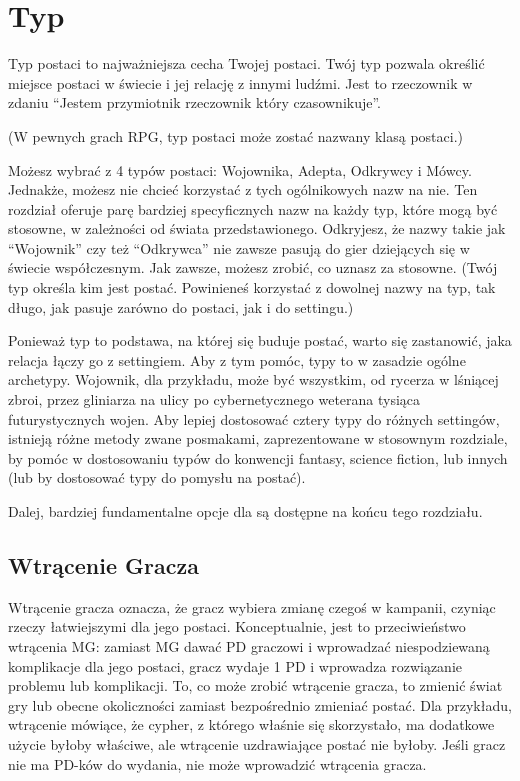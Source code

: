 \section{Typ}

Typ postaci to najważniejsza cecha Twojej postaci. Twój typ pozwala określić miejsce postaci w świecie i jej relację z innymi ludźmi. Jest to rzeczownik w zdaniu “Jestem przymiotnik rzeczownik który czasownikuje”.

(W pewnych grach RPG, typ postaci może zostać nazwany klasą postaci.)

Możesz wybrać z 4 typów postaci: Wojownika, Adepta, Odkrywcy i Mówcy. Jednakże, możesz nie chcieć korzystać z tych ogólnikowych nazw na nie. Ten rozdział oferuje parę bardziej specyficznych nazw na każdy typ, które mogą być stosowne, w zależności od świata przedstawionego. Odkryjesz, że nazwy takie jak “Wojownik” czy też “Odkrywca” nie zawsze pasują do gier dziejących się w świecie współczesnym. Jak zawsze, możesz zrobić, co uznasz za stosowne. (Twój typ określa kim jest postać. Powinieneś korzystać z dowolnej nazwy na typ, tak długo, jak pasuje zarówno do postaci, jak i do settingu.)

Ponieważ typ to podstawa, na której się buduje postać, warto się zastanowić, jaka relacja łączy go z settingiem. Aby z tym pomóc, typy to w zasadzie ogólne archetypy. Wojownik, dla przykładu, może być wszystkim, od rycerza w lśniącej zbroi, przez gliniarza na ulicy po cybernetycznego weterana tysiąca futurystycznych wojen.
Aby lepiej dostosować cztery typy do różnych settingów, istnieją różne metody zwane posmakami,  zaprezentowane w stosownym rozdziale, by pomóc w dostosowaniu typów do konwencji fantasy, science fiction, lub innych (lub by dostosować typy do pomysłu na postać).

Dalej, bardziej fundamentalne opcje dla  są dostępne na końcu tego rozdziału. 

\subsection{Wtrącenie Gracza}

Wtrącenie gracza oznacza, że gracz wybiera zmianę czegoś w kampanii, czyniąc rzeczy łatwiejszymi dla jego postaci. Konceptualnie, jest to przeciwieństwo wtrącenia MG: zamiast MG dawać PD graczowi i wprowadzać niespodziewaną komplikacje dla jego postaci, gracz wydaje 1 PD i wprowadza rozwiązanie problemu lub komplikacji. To, co może zrobić wtrącenie gracza, to zmienić świat gry lub obecne okoliczności zamiast bezpośrednio zmieniać postać. Dla przykładu, wtrącenie mówiące, że cypher, z którego właśnie się skorzystało, ma dodatkowe użycie byłoby właściwe, ale wtrącenie uzdrawiające postać nie byłoby. Jeśli gracz nie ma PD-ków do wydania, nie może wprowadzić wtrącenia gracza. 

